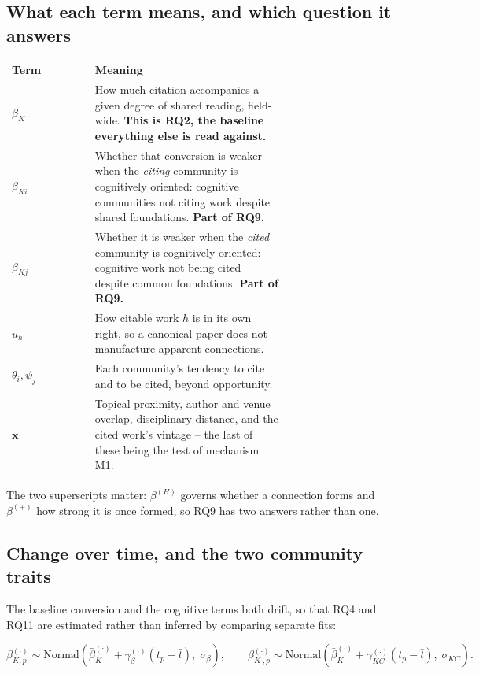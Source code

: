 \documentclass[11pt]{article}
\newcommand{\doublerule}{%
  \specialrule{\lightrulewidth}{0pt}{\doublerulesep}%
  \specialrule{\lightrulewidth}{0pt}{0pt}}
\begin{document}
\subsection{What each term means, and which question it answers}

\begin{center}
\small
\begin{tabular}{@{}lp{0.70\linewidth}@{}}
\toprule
\textbf{Term} & \textbf{Meaning}\\
\doublerule
$\beta_{K}$ & How much citation accompanies a given degree of shared reading, field-wide.
\textbf{This is RQ2, the baseline everything else is read against.}\\[3pt]
$\beta_{Ki}$ & Whether that conversion is weaker when the \emph{citing} community is
cognitively oriented: cognitive communities not citing work despite shared foundations.
\textbf{Part of RQ9.}\\[3pt]
$\beta_{Kj}$ & Whether it is weaker when the \emph{cited} community is cognitively
oriented: cognitive work not being cited despite common foundations.
\textbf{Part of RQ9.}\\[3pt]
$u_h$ & How citable work $h$ is in its own right, so a canonical paper does not manufacture
apparent connections.\\[3pt]
$\theta_i,\psi_j$ & Each community's tendency to cite and to be cited, beyond opportunity.\\[3pt]
$\boldsymbol{x}$ & Topical proximity, author and venue overlap, disciplinary distance, and
the cited work's vintage -- the last of these being the test of mechanism M1.\\
\bottomrule
\end{tabular}
\end{center}

The two superscripts matter: $\beta^{(H)}$ governs whether a connection forms and
$\beta^{(+)}$ how strong it is once formed, so RQ9 has two answers rather than one.

\subsection{Change over time, and the two community traits}

The baseline conversion and the cognitive terms both drift, so that RQ4 and RQ11 are
estimated rather than inferred by comparing separate fits:

\begin{equation}
\beta^{(\cdot)}_{K,p} \sim \mathrm{Normal}\!\left(\bar{\beta}^{(\cdot)}_{K}
  + \gamma^{(\cdot)}_\beta (t_p - \bar{t}),\; \sigma_\beta\right),
\qquad
\beta^{(\cdot)}_{K\cdot,p} \sim \mathrm{Normal}\!\left(\bar{\beta}^{(\cdot)}_{K\cdot}
  + \gamma^{(\cdot)}_{KC} (t_p - \bar{t}),\; \sigma_{KC}\right).
\end{equation}
\end{document}
